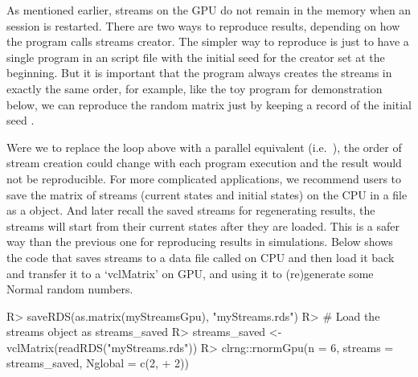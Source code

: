 \documentclass[article,nojss]{jss}\usepackage[]{graphicx}\usepackage[]{color}
\begin{document}
As mentioned earlier, streams on the GPU do not remain in the memory when an  session is restarted. There are two ways to reproduce results, depending on how the program calls streams creator.
The simpler way to reproduce is just to have a single program in an  script file with the initial seed for the creator set at the beginning.  But it is important that the program always creates the streams in exactly the same order, for example, like the toy  program for demonstration below, we can reproduce the random matrix  just by keeping a record of the initial seed .
\begin{CodeChunk}
\end{CodeChunk} 


Were we to replace the  loop above with a parallel equivalent (i.e.\ ), the order of stream creation could change with each program execution and the result would not be reproducible.  For more complicated applications, we recommend users to save the matrix of streams (current states and initial states) on the CPU in a file as a  object. And later recall the saved streams for regenerating results, the streams will start from their current states after they are loaded. This is a safer way than the previous one for reproducing results in simulations. Below shows the code that saves streams to a data file called  on CPU and then load it back and transfer it to a `vclMatrix'  on GPU, and using it to (re)generate some Normal random numbers.
\begin{CodeChunk}
\begin{CodeInput}
R> saveRDS(as.matrix(myStreamsGpu), "myStreams.rds")
R> # Load the streams object as streams_saved
R> streams_saved <- vclMatrix(readRDS("myStreams.rds"))
R> clrng::rnormGpu(n = 6, streams = streams_saved, Nglobal = c(2,
+    2))
\end{CodeInput} 
\end{CodeChunk} 
\end{document}
